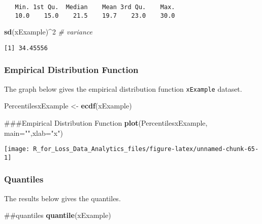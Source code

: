 \documentclass[]{book}
\newenvironment{Shaded}{\begin{snugshade}}{\end{snugshade}}
\newcommand{\KeywordTok}[1]{\textcolor[rgb]{0.13,0.29,0.53}{\textbf{#1}}}
\newcommand{\DataTypeTok}[1]{\textcolor[rgb]{0.13,0.29,0.53}{#1}}
\newcommand{\DecValTok}[1]{\textcolor[rgb]{0.00,0.00,0.81}{#1}}
\newcommand{\StringTok}[1]{\textcolor[rgb]{0.31,0.60,0.02}{#1}}
\newcommand{\CommentTok}[1]{\textcolor[rgb]{0.56,0.35,0.01}{\textit{#1}}}
\newcommand{\OperatorTok}[1]{\textcolor[rgb]{0.81,0.36,0.00}{\textbf{#1}}}
\newcommand{\NormalTok}[1]{#1}
\theoremstyle{definition}
\theoremstyle{definition}
\theoremstyle{definition}
\theoremstyle{remark}
\begin{document}
\begin{verbatim}
   Min. 1st Qu.  Median    Mean 3rd Qu.    Max. 
   10.0    15.0    21.5    19.7    23.0    30.0 
\end{verbatim}

\begin{Shaded}
\begin{Highlighting}[]
\KeywordTok{sd}\NormalTok{(xExample)}\OperatorTok{^}\DecValTok{2}   \CommentTok{# variance }
\end{Highlighting}
\end{Shaded}

\begin{verbatim}
[1] 34.45556
\end{verbatim}

\subsubsection{Empirical Distribution
Function}\label{empirical-distribution-function}

The graph below gives the empirical distribution function
\texttt{xExample} dataset.

\begin{Shaded}
\begin{Highlighting}[]
\NormalTok{PercentilesxExample <-}\StringTok{ }\KeywordTok{ecdf}\NormalTok{(xExample)}

\NormalTok{###Empirical Distribution Function}
\KeywordTok{plot}\NormalTok{(PercentilesxExample, }\DataTypeTok{main=}\StringTok{""}\NormalTok{,}\DataTypeTok{xlab=}\StringTok{"x"}\NormalTok{)}
\end{Highlighting}
\end{Shaded}

\begin{center}\texttt{[image: R\_for\_Loss\_Data\_Analytics\_files/figure-latex/unnamed-chunk-65-1]} \end{center}

\subsubsection{Quantiles}\label{quantiles}

The results below gives the quantiles.

\begin{Shaded}
\begin{Highlighting}[]
\NormalTok{##quantiles }
\KeywordTok{quantile}\NormalTok{(xExample)}
\end{Highlighting}
\end{Shaded}
\end{document}
